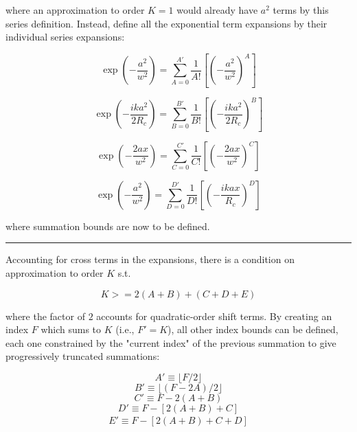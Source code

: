 \documentclass[aps,twoside,secnumarabic,balancelastpage,amsmath,amssymb,nofootinbib,hyperref=pdftex]{revtex4}
\begin{document}
where an approximation to order $K=1$ would already have $a^2$ terms by this series definition. Instead, define all the exponential term expansions by their individual series expansions:

\begin{equation}\label{TH:shift1}
\exp(-\frac{a^2}{w^2})
=
\sum_{A=0}^{A'}
	\frac{1}{A!}
\left[
	(-\frac{a^2}{w^2})^A	
\right]
\end{equation}

\begin{equation}\label{TH:shift2}
\exp(-\frac{ika^2}{2 R_c})
=
\sum_{B=0}^{B'}
	\frac{1}{B!}
\left[
	(-\frac{ika^2}{2R_c})^B	
\right]
\end{equation}

\begin{equation}\label{TH:shift3}
\exp(-\frac{2ax}{w^2})
=
\sum_{C=0}^{C'}
	\frac{1}{C!}
\left[
	(-\frac{2ax}{w^2})^C
\right]
\end{equation}

\begin{equation}\label{TH:shift4}
\exp(-\frac{a^2}{w^2})
=
\sum_{D=0}^{D'}
	\frac{1}{D!}
\left[
	(-\frac{ikax}{R_c})^D	
\right]
\end{equation}
	
where summation bounds are now to be defined.


\rule{\textwidth}{0.4pt}

\clearpage

Accounting for cross terms in the expansions, there is a condition on approximation to order $K$ s.t.

\begin{equation}\label{Keq}
	K >= 2(A+B)+(C+D+E)
\end{equation} 

where the factor of $2$ accounts for quadratic-order shift terms. By creating an index $F$ which sums to $K$ (i.e., $F'=K$), all other index bounds can be defined, each one constrained by the "current index" of the previous summation to give progressively truncated summations:

\begin{equation}
	A' \equiv \lfloor F/2 \rfloor
\end{equation}
\begin{equation}
	B' \equiv \lfloor (F-2A)/2 \rfloor
\end{equation}
\begin{equation}
	C' \equiv F-2(A+B)
\end{equation}
\begin{equation}
	D' \equiv F-\left[2(A+B)+C\right]
\end{equation}
\begin{align*}
	E' \equiv F-\left[ 2(A+B)+C+D \right]
\end{align*}
\end{document}
